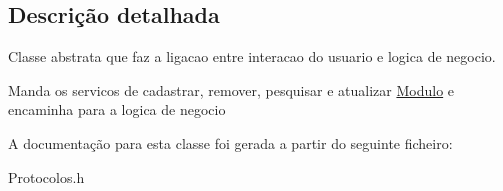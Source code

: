 \subsection{\-Descrição detalhada}
\-Classe abstrata que faz a ligacao entre interacao do usuario e logica de negocio. 

\-Manda os servicos de cadastrar, remover, pesquisar e atualizar \hyperlink{class_modulo}{\-Modulo} e encaminha para a logica de negocio 

\-A documentação para esta classe foi gerada a partir do seguinte ficheiro\-:\begin{DoxyCompactItemize}
\item 
\-Protocolos.\-h\end{DoxyCompactItemize}
